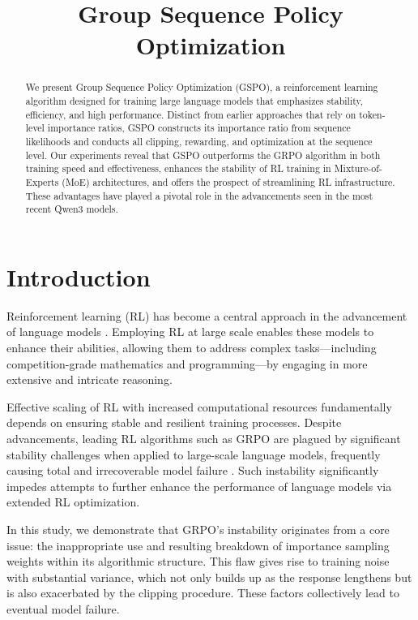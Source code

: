 \title{Group Sequence Policy Optimization}

\begin{abstract}
We present Group Sequence Policy Optimization (GSPO), a reinforcement learning algorithm designed for training large language models that emphasizes stability, efficiency, and high performance. Distinct from earlier approaches that rely on token-level importance ratios, GSPO constructs its importance ratio from sequence likelihoods and conducts all clipping, rewarding, and optimization at the sequence level. Our experiments reveal that GSPO outperforms the GRPO algorithm in both training speed and effectiveness, enhances the stability of RL training in Mixture-of-Experts (MoE) architectures, and offers the prospect of streamlining RL infrastructure. These advantages have played a pivotal role in the advancements seen in the most recent Qwen3 models.
\end{abstract}

\section{Introduction}
\label{sec:intro}

Reinforcement learning (RL) has become a central approach in the advancement of language models \citep{o1,dpsk-r1,qwq32b,qwen3}. Employing RL at large scale enables these models to enhance their abilities, allowing them to address complex tasks—including competition-grade mathematics and programming—by engaging in more extensive and intricate reasoning.

Effective scaling of RL with increased computational resources fundamentally depends on ensuring stable and resilient training processes. Despite advancements, leading RL algorithms such as GRPO \citep{grpo} are plagued by significant stability challenges when applied to large-scale language models, frequently causing total and irrecoverable model failure \citep{qwen3, minimax-m1}. Such instability significantly impedes attempts to further enhance the performance of language models via extended RL optimization.

In this study, we demonstrate that GRPO's instability originates from a core issue: the inappropriate use and resulting breakdown of importance sampling weights within its algorithmic structure. This flaw gives rise to training noise with substantial variance, which not only builds up as the response lengthens but is also exacerbated by the clipping procedure. These factors collectively lead to eventual model failure.

